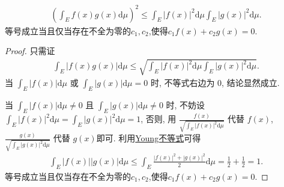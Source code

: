\documentclass[../../main.tex]{subfiles}%
\begin{document}
\begin{theorem}[Cauchy积分不等式]\label{theorem:Cauchy积分不等式}
\begin{align*}
\left(\int_E f(x)g(x) \mathrm{d}\mu\right)^2 \leqslant \int_E |f(x)|^2 \mathrm{d}\mu \int_E |g(x)|^2 \mathrm{d}\mu.
\end{align*} 
等号成立当且仅当存在不全为零的$c_1,c_2$,使得$c_1f(x)+c_2g(x)=0.$
\end{theorem}
\begin{proof}

只需证
\begin{align*}
\int_E |f(x)g(x)| \mathrm{d}\mu \leqslant \sqrt{\int_E |f(x)|^2 \mathrm{d}\mu \int_E |g(x)|^2 \mathrm{d}\mu}.
\end{align*}
当 $\int_E |f(x)| \mathrm{d}\mu$ 或 $\int_E |g(x)| \mathrm{d}\mu = 0$ 时, 不等式右边为 $0$, 结论显然成立.

当 $\int_E |f(x)| \mathrm{d}\mu \ne 0$ 且 $\int_E |g(x)| \mathrm{d}\mu \ne 0$ 时, 不妨设 $\int_E |f(x)|^2 \mathrm{d}\mu = \int_E |g(x)|^2 \mathrm{d}\mu = 1$, 否则, 用 $\frac{f(x)}{\sqrt{\int_E |f(x)|^2 \mathrm{d}\mu}}$ 代替 $f(x)$, $\frac{g(x)}{\sqrt{\int_E |g(x)|^2 \mathrm{d}\mu}}$ 代替 $g(x)$即可.
利用\hyperref[theorem:Young不等式初等形式]{Young不等式}可得
\begin{align*}
\int_E |f(x)||g(x)| \mathrm{d}\mu \leqslant \int_E \frac{|f(x)|^2 + |g(x)|^2}{2} \mathrm{d}\mu = \frac{1}{2} + \frac{1}{2} = 1.
\end{align*}
等号成立当且仅当存在不全为零的$c_1,c_2$,使得$c_1f(x)+c_2g(x)=0.$

\end{proof}
\end{document}
